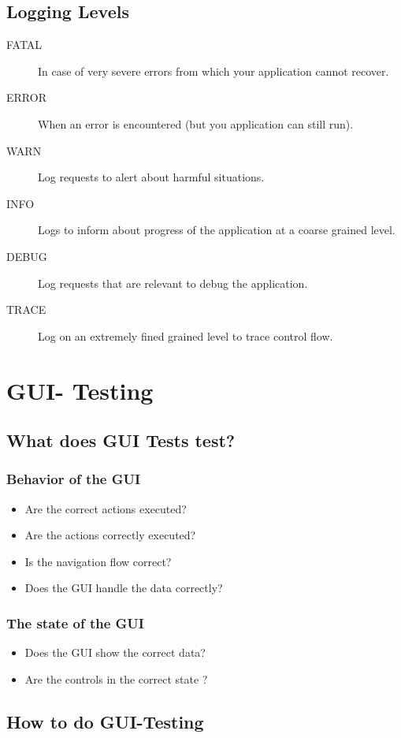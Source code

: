 \documentclass[a4paper,10pt]{article}
\begin{document}
\subsection{Logging Levels}
\begin{description}
	\item[FATAL] In case of very severe errors from which your application cannot recover.
	\item[ERROR] When an error is encountered (but you application can still run).
	\item[WARN] Log requests to alert about harmful situations.
	\item[INFO] Logs to inform about progress of the application at a coarse grained level.
	\item[DEBUG] Log requests that are relevant to debug the application.
	\item[TRACE] Log on an extremely fined grained level to trace control flow.
\end{description}

\section{GUI- Testing}
\subsection{What does GUI Tests test?}
\subsubsection{Behavior of the GUI}
\begin{itemize}
\item Are the correct actions executed?
\item Are the actions correctly executed?
\item Is the navigation flow correct?
\item Does the GUI handle the data correctly?
\end{itemize}
\subsubsection{The state of the GUI}
\begin{itemize}
\item Does the GUI show the correct data?
\item Are the controls in the correct state ?
\end{itemize}

\subsection{How to do GUI-Testing}
\end{document}
